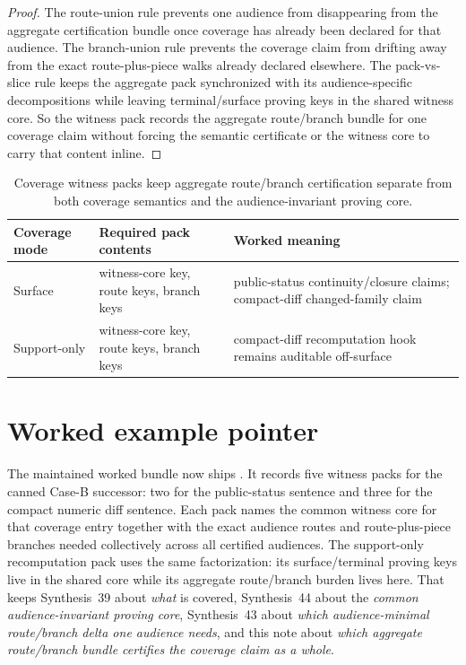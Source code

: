 \documentclass[11pt]{article}
\begin{document}
\begin{proof}
The route-union rule prevents one audience from disappearing from the aggregate certification bundle once coverage has already been declared for that audience.
The branch-union rule prevents the coverage claim from drifting away from the exact route-plus-piece walks already declared elsewhere.
The pack-vs-slice rule keeps the aggregate pack synchronized with its audience-specific decompositions while leaving terminal/surface proving keys in the shared witness core.
So the witness pack records the aggregate route/branch bundle for one coverage claim without forcing the semantic certificate or the witness core to carry that content inline.
\end{proof}

\begin{table}[t]
\centering
\small
\begin{tabularx}{\linewidth}{@{}l l X@{}}
\toprule
Coverage mode & Required pack contents & Worked meaning \\
\midrule
Surface & witness-core key, route keys, branch keys & public-status continuity/closure claims; compact-diff changed-family claim \\
Support-only & witness-core key, route keys, branch keys & compact-diff recomputation hook remains auditable off-surface \\
\bottomrule
\end{tabularx}
\caption{Coverage witness packs keep aggregate route/branch certification separate from both coverage semantics and the audience-invariant proving core.}
\label{tab:coveragewitnesspacks}
\end{table}

\section{Worked example pointer}
The maintained worked bundle now ships .\cite{series:workedexample}
It records five witness packs for the canned Case-B successor: two for the public-status sentence and three for the compact numeric diff sentence.
Each pack names the common witness core for that coverage entry together with the exact audience routes and route-plus-piece branches needed collectively across all certified audiences.
The support-only recomputation pack uses the same factorization: its surface/terminal proving keys live in the shared core while its aggregate route/branch burden lives here.
That keeps Synthesis~39 about \emph{what} is covered, Synthesis~44 about the \emph{common audience-invariant proving core}, Synthesis~43 about \emph{which audience-minimal route/branch delta one audience needs}, and this note about \emph{which aggregate route/branch bundle certifies the coverage claim as a whole}.\cite{series:challengecoverage,series:challengecoveragewitnesscores,series:challengecoveragewitnessslices}
\end{document}

